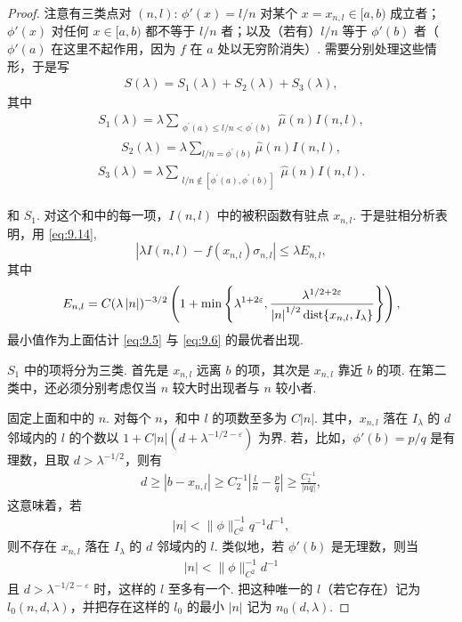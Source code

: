 \begin{proof}
注意有三类点对 $(n,l)$: $\phi'(x) = l/n$ 对某个 $x = x_{n,l} \in [a, b)$ 成立者；$\phi'(x)$ 对任何 $x \in [a, b)$ 都不等于 $l/n$ 者；以及（若有）$l/n$ 等于 $\phi'(b)$ 者（$\phi'(a)$ 在这里不起作用，因为 $f$ 在 $a$ 处以无穷阶消失）. 需要分别处理这些情形，于是写
\begin{align*}
  S(\lambda)=S_{1}(\lambda)+S_{2}(\lambda)+S_{3}(\lambda),
\end{align*}
其中
\begin{align*}
  S_{1}(\lambda)=\lambda\sum_{\substack{\phi^{\prime}(a)\leq l/n<\phi^{\prime}(b)}}\hat{\mu}(n)I(n,l),
\end{align*}
\begin{align*}
  S_{2}(\lambda)=\lambda\sum_{l/n=\phi^{\prime}(b)}\hat{\mu}(n)I(n,l),
\end{align*}
\begin{align*}
  S_{3}(\lambda)=\lambda\sum_{\substack{l/n\notin[\phi^{\prime}(a),\phi^{\prime}(b)]}}\hat{\mu}(n)I(n,l).
\end{align*}

和 $S_{1}$. 对这个和中的每一项，$I(n,l)$ 中的被积函数有驻点 $x_{n,l}$. 于是驻相分析表明，用 \eqref{eq:9.14},
\begin{equation}\label{eq:9.15}
  |\lambda I(n,l)-f(x_{n,l})\sigma_{n,l}|\leq\lambda E_{n,l},
\end{equation}
其中
\begin{align*}
  E_{n,l}=C(\lambda\left|n\right|)^{-3/2}
  \left(1+\min\left\{\lambda^{1+2\varepsilon},
  \frac{\lambda^{1/2+2\varepsilon}}{\left|n\right|^{1/2}\operatorname{dist}\{x_{n,l},I_{\lambda}\}}\right\}\right),
\end{align*}
最小值作为上面估计 \eqref{eq:9.5} 与 \eqref{eq:9.6} 的最优者出现.

$S_{1}$ 中的项将分为三类. 首先是 $x_{n,l}$ 远离 $b$ 的项，其次是 $x_{n,l}$ 靠近 $b$ 的项. 在第二类中，还必须分别考虑仅当 $n$ 较大时出现者与 $n$ 较小者.

固定上面和中的 $n$. 对每个 $n$，和中 $l$ 的项数至多为 $C|n|$. 其中，$x_{n,l}$ 落在 $I_\lambda$ 的 $d$ 邻域内的 $l$ 的个数以 $1 + C|n|(d + \lambda^{-1/2-\varepsilon})$ 为界. 若，比如，$\phi'(b) = p/q$ 是有理数，且取 $d > \lambda^{-1/2}$，则有
\begin{align*}
  d\geq\left|b-x_{n,l}\right|\geq C_{2}^{-1}\left|\frac{l}{n}-\frac{p}{q}\right|
  \geq\frac{C_{2}^{-1}}{\left|n q\right|},
\end{align*}
这意味着，若
\begin{align*}
  |n|<\|\phi\|_{C^{2}}^{-1}q^{-1}d^{-1},
\end{align*}
则不存在 $x_{n,l}$ 落在 $I_{\lambda}$ 的 $d$ 邻域内的 $l$. 类似地，若 $\phi'(b)$ 是无理数，则当
\begin{align*}
  |n|<\|\phi\|_{C^{2}}^{-1}d^{-1}
\end{align*}
且 $d > \lambda^{-1/2-\varepsilon}$ 时，这样的 $l$ 至多有一个. 把这种唯一的 $l$（若它存在）记为 $l_0(n, d, \lambda)$，并把存在这样的 $l_0$ 的最小 $|n|$ 记为 $n_0(d, \lambda)$.


\end{proof}
